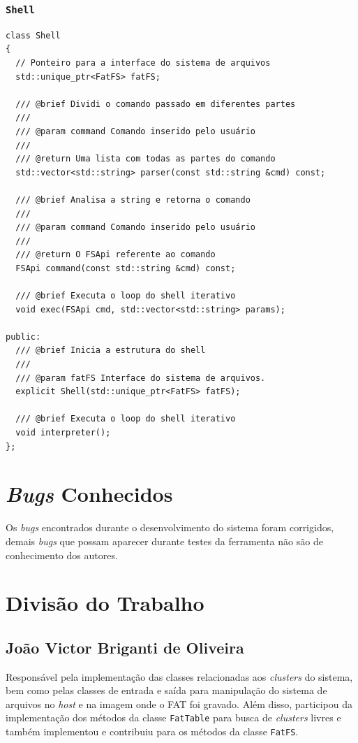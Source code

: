 \documentclass[
    12pt,				%
    oneside,   	        %
    a4paper,			%
    english,			%
    french,				%
    spanish,			%
    brazil,				%
    ]{pacotes/abntex2}
\begin{document}
\subsubsection{\texttt{Shell}}
\label{subsubsec:shell}

\begin{lstlisting}[caption={Classe que implementa o \textit{shell}}, label={lst:shell}]
class Shell
{
  // Ponteiro para a interface do sistema de arquivos
  std::unique_ptr<FatFS> fatFS;

  /// @brief Dividi o comando passado em diferentes partes
  ///
  /// @param command Comando inserido pelo usuário
  ///
  /// @return Uma lista com todas as partes do comando
  std::vector<std::string> parser(const std::string &cmd) const;

  /// @brief Analisa a string e retorna o comando
  ///
  /// @param command Comando inserido pelo usuário
  ///
  /// @return O FSApi referente ao comando
  FSApi command(const std::string &cmd) const;

  /// @brief Executa o loop do shell iterativo
  void exec(FSApi cmd, std::vector<std::string> params);

public:
  /// @brief Inicia a estrutura do shell
  ///
  /// @param fatFS Interface do sistema de arquivos.
  explicit Shell(std::unique_ptr<FatFS> fatFS);

  /// @brief Executa o loop do shell iterativo
  void interpreter();
};
\end{lstlisting}

\section{\textit{Bugs} Conhecidos}
\label{sec:bugs}

Os \textit{bugs} encontrados durante o desenvolvimento do sistema foram corrigidos, demais \textit{bugs} que possam aparecer durante testes da ferramenta não são de conhecimento dos autores.

\section{Divisão do Trabalho}
\label{sec:trabalhadores_univos}

\subsection{João Victor Briganti de Oliveira}
\label{subsec:joao}

Responsável pela implementação das classes relacionadas aos \textit{clusters} do sistema, bem como pelas classes de entrada e saída para manipulação do sistema de arquivos no \textit{host} e na imagem onde o FAT foi gravado. Além disso, participou da implementação dos métodos da classe \texttt{FatTable} para busca de \textit{clusters} livres e também implementou e contribuiu para os métodos da classe \texttt{FatFS}.
\end{document}
